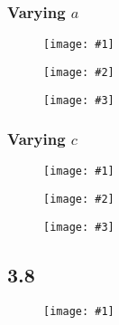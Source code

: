 \documentclass[11pt]{article}
\newcommand{\triplefigure}[3]{
\begin{figure}[H]
  \centering
  \begin{minipage}{0.3\textwidth}
    \centering
    \texttt{[image: \#1]}
  \end{minipage}
  \begin{minipage}{0.3\textwidth}
    \centering
    \texttt{[image: \#2]}
  \end{minipage}
  \begin{minipage}{0.3\textwidth}
    \centering
    \texttt{[image: \#3]}
  \end{minipage}
\end{figure}
}
\newcommand{\singlefigure}[1]{
\begin{figure}[H]
  \centering
  \begin{minipage}{0.4\textwidth}
    \centering
    \texttt{[image: \#1]}
  \end{minipage}
\end{figure}
}
\begin{document}
\subsubsection*{Varying $a$}
\triplefigure{./plots/3_7/randomwalk_1000_r1_a4_c4_m128.png}{./plots/3_7/randomwalk_1000_r1_a5_c4_m128.png}{./plots/3_7/randomwalk_1000_r1_a6_c4_m128.png}
\subsubsection*{Varying $c$}
\triplefigure{./plots/3_7/randomwalk_1000_r1_a3_c5_m128.png}{./plots/3_7/randomwalk_1000_r1_a3_c6_m128.png}{./plots/3_7/randomwalk_1000_r1_a3_c7_m128.png}

\subsection*{3.8}
\singlefigure{./plots/3_8/walklen.png}
\end{document}
